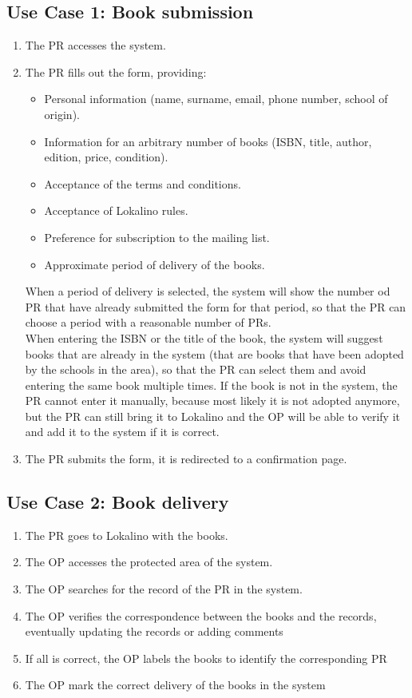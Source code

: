 \subsection{Use Case 1: Book submission}

\begin{enumerate}
    \item The PR accesses the system.
    \item The PR fills out the form, providing:
          \begin{itemize}
              \item Personal information (name, surname, email, phone number, school of origin).
              \item Information for an arbitrary number of books (ISBN, title, author, edition, price, condition).
              \item Acceptance of the terms and conditions.
              \item Acceptance of Lokalino rules.
              \item Preference for subscription to the mailing list.
              \item Approximate period of delivery of the books.
          \end{itemize}
          When a period of delivery is selected, the system will show the number od PR that have already submitted the form for that period, so that the PR can choose a period with a reasonable number of PRs.\\
          When entering the ISBN or the title of the book, the system will suggest books that are already in the system (that are books that have been adopted by the schools in the area), so that the PR can select them and avoid entering the same book multiple times. If the book is not in the system, the PR cannot enter it manually, because most likely it is not adopted anymore, but the PR can still bring it to Lokalino and the OP will be able to verify it and add it to the system if it is correct.
    \item The PR submits the form, it is redirected to a confirmation page.
\end{enumerate}

\subsection{Use Case 2: Book delivery}

\begin{enumerate}
    \item The PR goes to Lokalino with the books.
    \item The OP accesses the protected area of the system.
    \item The OP searches for the record of the PR in the system.
    \item The OP verifies the correspondence between the books and the records, eventually updating the records or adding comments
    \item If all is correct, the OP labels the books to identify the corresponding PR
    \item The OP mark the correct delivery of the books in the system
\end{enumerate}

